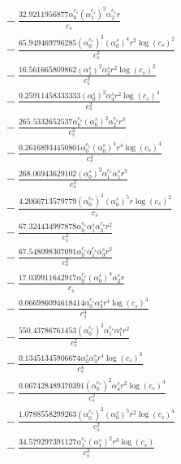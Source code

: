 \documentclass[10pt]{article}
\begin{document}
\begin{align*}
&{}  - \frac{32.9211956877 \alpha_{0}^{c_s} \left(\alpha_{1}^{c_s}\right)^{2} \alpha_{2}^{c_s} r}{c_{s}} \\
&{}  - \frac{65.949469796285 \left(\alpha_{0}^{c_s}\right)^{3} \left(\alpha_{0}^s\right)^{4} r^{2} \log{\left(c_{s} \right)}^{2}}{c_{s}^{2}} \\
&{}  - \frac{16.561665809862 \left(\alpha_{1}^s\right)^{2} \alpha_{2}^s r^{2} \log{\left(c_{s} \right)}^{2}}{c_{s}^{2}} \\
&{}  - \frac{0.25911458333333 \left(\alpha_{0}^s\right)^{2} \alpha_{4}^s r^{2} \log{\left(c_{s} \right)}^{4}}{c_{s}^{2}} \\
&{}  - \frac{265.5332652537 \alpha_{0}^{c_s} \left(\alpha_{0}^s\right)^{2} \alpha_{2}^{c_s} r^{3}}{c_{s}^{3}} \\
&{}  - \frac{0.26168934450801 \alpha_{0}^{c_s} \left(\alpha_{0}^s\right)^{4} r^{4} \log{\left(c_{s} \right)}^{4}}{c_{s}^{4}} \\
&{}  - \frac{268.06943629102 \left(\alpha_{0}^s\right)^{2} \alpha_{1}^{c_s} \alpha_{1}^s r^{3}}{c_{s}^{3}} \\
&{}  - \frac{4.2066713579779 \left(\alpha_{0}^{c_s}\right)^{3} \left(\alpha_{0}^s\right)^{5} r \log{\left(c_{s} \right)}^{2}}{c_{s}} \\
&{}  - \frac{67.324434997878 \alpha_{0}^{c_s} \alpha_{1}^s \alpha_{3}^{c_s} r^{2}}{c_{s}^{2}} \\
&{}  - \frac{67.548098307091 \alpha_{0}^{c_s} \alpha_{1}^{c_s} \alpha_{3}^s r^{2}}{c_{s}^{2}} \\
&{}  - \frac{17.039911642917 \alpha_{0}^{c_s} \left(\alpha_{0}^s\right)^{4} \alpha_{2}^s r}{c_{s}} \\
&{}  - \frac{0.066986094618414 \alpha_{0}^{c_s} \alpha_{3}^s r^{4} \log{\left(c_{s} \right)}^{3}}{c_{s}^{4}} \\
&{}  - \frac{550.43786761453 \left(\alpha_{0}^{c_s}\right)^{3} \alpha_{1}^{c_s} \alpha_{1}^s r^{2}}{c_{s}^{2}} \\
&{}  - \frac{0.13451345906674 \alpha_{0}^s \alpha_{3}^s r^{4} \log{\left(c_{s} \right)}^{3}}{c_{s}^{4}} \\
&{}  - \frac{0.067428489370391 \left(\alpha_{0}^{c_s}\right)^{2} \alpha_{4}^s r^{2} \log{\left(c_{s} \right)}^{4}}{c_{s}^{2}} \\
&{}  - \frac{1.0788558299263 \left(\alpha_{0}^{c_s}\right)^{2} \left(\alpha_{0}^s\right)^{5} r^{2} \log{\left(c_{s} \right)}^{4}}{c_{s}^{2}} \\
&{}  - \frac{34.579297391127 \alpha_{1}^{c_s} \left(\alpha_{1}^s\right)^{2} r^{3} \log{\left(c_{s} \right)}}{c_{s}^{3}} \\

\end{align*}
\end{document}

